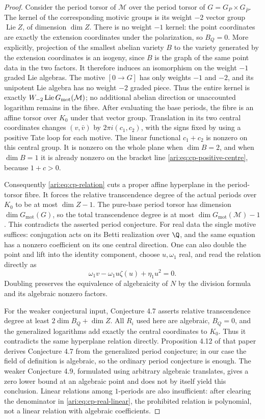 \begin{proof}
Consider the period torsor of $\mathcal M$ over the period
torsor of $G=G_P\times G_{\bar P}$. The kernel of the
corresponding motivic groups is its weight $-2$ vector group
$\operatorname{Lie}Z$, of dimension $\dim Z$. There is no
weight $-1$ kernel: the point coordinates are exactly the
extension coordinates under the polarization, so $B_Q=0$.
More explicitly, projection of the smallest abelian variety $B$
to the variety generated by the extension coordinates is an
isogeny, since $B$ is the graph of the same point data in the
two factors. It therefore induces an isomorphism on the
weight $-1$ graded Lie algebras. The motive $[0\to G]$ has
only weights $-1$ and $-2$, and its unipotent Lie algebra has
no weight $-2$ graded piece. Thus the entire kernel is exactly
$W_{-2}\operatorname{Lie}G_{\rm mot}(\mathcal M)$; no additional
abelian direction or unaccounted logarithm remains in the fibre.
After evaluating the base periods, the fibre is an affine
torsor over $K_0$ under that vector group. Translation in
its two central coordinates changes $(v,\bar v)$ by
$2\pi i(c_1,c_2)$, with the signs fixed by using a positive
Tate loop for each motive. The linear functional
$c_1+c_2$ is nonzero on this central group. It is nonzero
on the whole plane when $\dim B=2$, and when $\dim B=1$
it is already nonzero on the bracket line
\eqref{ari:eq:cp-positive-centre}, because $1+c>0$.

Consequently \eqref{ari:eq:cp-relation} cuts a proper affine
hyperplane in the period-torsor fibre. It forces the relative
transcendence degree of the actual periods over $K_0$ to be
at most $\dim Z-1$. The pure-base period torsor has dimension
$\dim G_{\mathrm{mot}}(G)$, so the total transcendence degree
is at most $\dim G_{\mathrm{mot}}(\mathcal M)-1$.
This contradicts the asserted period conjecture. For real
data the single motive suffices: conjugation acts on its
Betti realization over $\Q$, and the same equation has a
nonzero coefficient on its one central direction. One can
also double the point and lift into the identity component,
choose $u,\omega_1$ real, and read the relation directly as
\[
 \omega_1 v-\omega_1u\zeta(u)+\eta_1u^2=0.
\]
Doubling preserves the equivalence of algebraicity of $N$
by the division formula and its algebraic nonzero factors.

For the weaker conjectural input, Conjecture 4.7 asserts
relative transcendence degree at least $2\dim B_Q+\dim Z$.
All $R_i$ used here are algebraic, $B_Q=0$, and the
generalized logarithms add exactly the central coordinates
to $K_0$. Thus it contradicts the same hyperplane relation
directly. Proposition 4.12 of that paper derives Conjecture
4.7 from the generalized period conjecture; in our case the
field of definition is algebraic, so the ordinary period
conjecture is enough. The weaker Conjecture 4.9, formulated
using arbitrary algebraic translates, gives a zero lower
bound at an algebraic point and does not by itself yield
this conclusion. Linear relations among $1$-periods are
also insufficient: after clearing the denominator in
\eqref{ari:eq:cp-real-linear}, the prohibited relation is
polynomial, not a linear relation with algebraic coefficients.
\end{proof}

